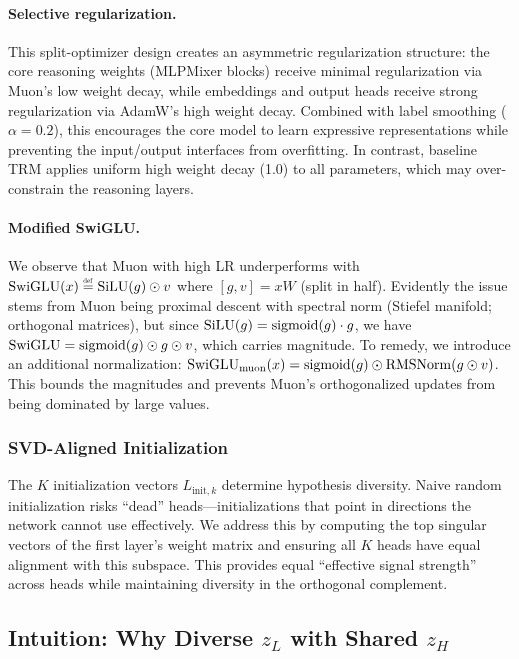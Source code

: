 \paragraph{Selective regularization.} This split-optimizer design creates an
asymmetric regularization structure: the core reasoning weights (MLPMixer
blocks) receive minimal regularization via Muon's low weight decay, while
embeddings and output heads receive strong regularization via AdamW's high
weight decay. Combined with label smoothing ($\alpha{=}0.2$), this encourages
the core model to learn expressive representations while preventing the
input/output interfaces from overfitting. In contrast, baseline TRM applies
uniform high weight decay (1.0) to all parameters, which may over-constrain
the reasoning layers.

\paragraph{Modified SwiGLU.} We observe that Muon with high LR underperforms
with $\operatorname{SwiGLU}(x)\defeq\operatorname{SiLU}(g) \odot v$ where $[g,
v] = xW$ (split in half). Evidently the issue stems from Muon being proximal
descent with spectral norm (Stiefel manifold; orthogonal matrices), but since
$\operatorname{SiLU}(g) = \operatorname{sigmoid}(g) \cdot g$, we have
$\operatorname{SwiGLU} = \operatorname{sigmoid}(g) \odot g \odot v$, which carries magnitude.
To remedy, we introduce an additional normalization:
$\operatorname{SwiGLU}_\text{muon}(x) = \operatorname{sigmoid}(g) \odot
\operatorname{RMSNorm}(g \odot v)$. This bounds the magnitudes and prevents
Muon's orthogonalized updates from being dominated by large values.

\subsubsection{SVD-Aligned Initialization}

The $K$ initialization vectors $L_{\text{init},k}$ determine hypothesis
diversity. Naive random initialization risks ``dead'' heads---initializations
that point in directions the network cannot use effectively. We address this by
computing the top singular vectors of the first layer's weight matrix and
ensuring all $K$ heads have equal alignment with this subspace. This provides
equal ``effective signal strength'' across heads while maintaining diversity in
the orthogonal complement.

\subsection{Intuition: Why Diverse $z_L$ with Shared $z_H$}

